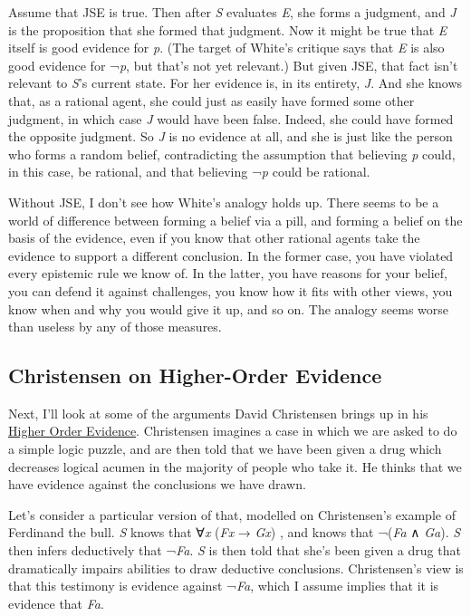 \documentclass[
  11pt,
  letterpaper,
  DIV=11,
  numbers=noendperiod,
  twoside]{scrartcl}
\begin{document}
Assume that JSE is true. Then after \emph{S} evaluates \emph{E}, she
forms a judgment, and \emph{J} is the proposition that she formed that
judgment. Now it might be true that \emph{E} itself is good evidence for
\emph{p}. (The target of White's critique says that \emph{E} is also
good evidence for ¬\emph{p}, but that's not yet relevant.) But given
JSE, that fact isn't relevant to \emph{S}'s current state. For her
evidence is, in its entirety, \emph{J}. And she knows that, as a
rational agent, she could just as easily have formed some other
judgment, in which case \emph{J} would have been false. Indeed, she
could have formed the opposite judgment. So \emph{J} is no evidence at
all, and she is just like the person who forms a random belief,
contradicting the assumption that believing \emph{p} could, in this
case, be rational, and that believing ¬\emph{p} could be rational.

Without JSE, I don't see how White's analogy holds up. There seems to be
a world of difference between forming a belief via a pill, and forming a
belief on the basis of the evidence, even if you know that other
rational agents take the evidence to support a different conclusion. In
the former case, you have violated every epistemic rule we know of. In
the latter, you have reasons for your belief, you can defend it against
challenges, you know how it fits with other views, you know when and why
you would give it up, and so on. The analogy seems worse than useless by
any of those measures.

\subsection{Christensen on Higher-Order
Evidence}\label{christensen-on-higher-order-evidence}

Next, I'll look at some of the arguments David Christensen brings up in
his
\href{http://www.brown.edu/Departments/Philosophy/faculty/christensen/Higher-OrderEvidence.pdf}{Higher
Order Evidence}. Christensen imagines a case in which we are asked to do
a simple logic puzzle, and are then told that we have been given a drug
which decreases logical acumen in the majority of people who take it. He
thinks that we have evidence against the conclusions we have drawn.

Let's consider a particular version of that, modelled on Christensen's
example of Ferdinand the bull. \emph{S} knows that ∀\emph{x} (\emph{Fx}
→ \emph{Gx}) , and knows that ¬(\emph{Fa} ∧ \emph{Ga}). \emph{S} then
infers deductively that ¬\emph{Fa}. \emph{S} is then told that she's
been given a drug that dramatically impairs abilities to draw deductive
conclusions. Christensen's view is that this testimony is evidence
against ¬\emph{Fa}, which I assume implies that it is evidence that
\emph{Fa}.
\end{document}
